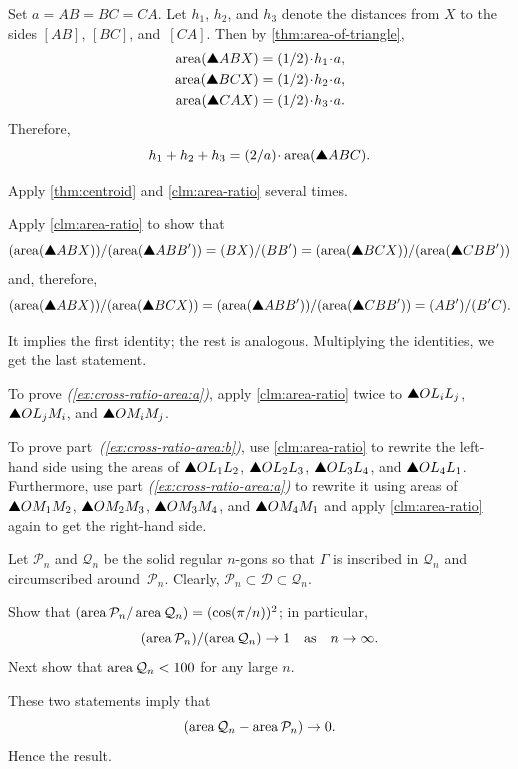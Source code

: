 Set $a=AB=BC=CA$.
Let $h_1$, $h_2$, and $h_3$ denote the distances from $X$ to the sides $[AB]$, $[BC]$, and~$[CA]$. 
Then by \ref{thm:area-of-triangle},
\begin{align*}
\area(\solidtriangle ABX)&=\tfrac12\cdot h_1\cdot a,
\\
\area(\solidtriangle BCX)&=\tfrac12\cdot h_2\cdot a,
\\
\area(\solidtriangle CAX)&=\tfrac12\cdot h_3\cdot a.
\end{align*}
Therefore, 
\[h_1+h_2+h_3=\tfrac2a\cdot\area(\solidtriangle ABC).\]

Apply \ref{thm:centroid} and \ref{clm:area-ratio} several times.

Apply \ref{clm:area-ratio} to show that
\[\frac{\area(\solidtriangle ABX)}{\area(\solidtriangle ABB')}=\frac{BX}{BB'}=\frac{\area(\solidtriangle BCX)}{\area(\solidtriangle CBB')}\]
and, therefore,
\[\frac{\area(\solidtriangle ABX)}{\area(\solidtriangle BCX)}=\frac{\area(\solidtriangle ABB')}{\area(\solidtriangle CBB')}=\frac{AB'}{B'C}.\]

It implies the first identity; the rest is analogous.
Multiplying the identities, we get the last statement.

To prove \textit{(\ref{ex:cross-ratio-area:a})}, apply \ref{clm:area-ratio} twice to $\solidtriangle OL_iL_j$, $\solidtriangle OL_jM_i$, and $\solidtriangle OM_iM_j$.

To prove part~\textit{(\ref{ex:cross-ratio-area:b})}, use \ref{clm:area-ratio} to rewrite the left-hand side using the areas of $\solidtriangle OL_1L_2$, $\solidtriangle OL_2L_3$, $\solidtriangle OL_3L_4$, and $\solidtriangle OL_4L_1$.
Furthermore, use part \textit{(\ref{ex:cross-ratio-area:a})} to rewrite it using areas of $\solidtriangle OM_1M_2$, $\solidtriangle OM_2M_3$, $\solidtriangle OM_3M_4$, and $\solidtriangle OM_4M_1$ and apply \ref{clm:area-ratio} again to get the right-hand side.


Let $\mathcal{P}_n$ and $\mathcal{Q}_n$ be the solid regular $n$-gons
so that $\Gamma$ is inscribed in $\mathcal{Q}_n$ and circumscribed around~$\mathcal{P}_n$.
Clearly,
$\mathcal{P}_n\subset\mathcal{D}\subset\mathcal{Q}_n$.

Show that 
$(\mathop{\rm area}\nolimits\mathcal{P}_n/\mathop{\rm area}\nolimits\mathcal{Q}_n)=(\cos(\pi/n))^2$;
in particular, 
$$(\mathop{\rm area}\nolimits\mathcal{P}_n)/(\mathop{\rm area}\nolimits\mathcal{Q}_n)\to 1
\quad
\text{as}
\quad
n\to\infty.$$
Next show that $\mathop{\rm area}\nolimits\mathcal{Q}_n<100$ for any large $n$.

These two statements imply that
\[(\area\mathcal{Q}_n\z-\area\mathcal{P}_n)\to 0.\]
Hence the result.

\spell{\end{multicols}}{}

\newpage
